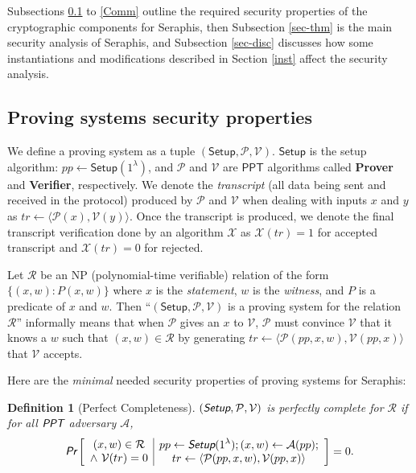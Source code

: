 \documentclass{article}
\newtheorem{definition}{Definition}[section]
\begin{document}
Subsections \ref{prov-prop} to \ref{Comm} outline the required security properties of the cryptographic components for Seraphis, then Subsection \ref{sec-thm} is the main security analysis of Seraphis, and Subsection \ref{sec-disc} discusses how some instantiations and modifications described in Section \ref{inst} affect the security analysis.

\subsection{Proving systems security properties}\label{prov-prop}
We define a proving system as a tuple $(\textsf{Setup}, \mathcal{P}, \mathcal{V})$. $\textsf{Setup}$ is the setup algorithm: $pp\leftarrow\textsf{Setup}(1^{\lambda})$, and $\mathcal{P}$ and $\mathcal{V}$ are $\textsf{PPT}$ algorithms called \textbf{Prover} and \textbf{Verifier}, respectively. We denote the \textit{transcript} (all data being sent and received in the protocol) produced by $\mathcal{P}$ and $\mathcal{V}$ when dealing with inputs $x$ and $y$ as $tr\leftarrow\langle\mathcal{P}(x), \mathcal{V}(y)\rangle$. Once the transcript is produced, we denote the final transcript verification done by an algorithm $\mathcal{X}$ as $\mathcal{X}(tr)=1$ for accepted transcript and $\mathcal{X}(tr)=0$ for rejected. 

Let $\mathcal{R}$ be an NP (polynomial-time verifiable) relation of the form $\{(x,w):P(x, w)\}$ where $x$ is the \textit{statement}, $w$ is the \textit{witness}, and $P$ is a predicate of $x$ and $w$. Then ``$(\textsf{Setup}, \mathcal{P}, \mathcal{V})$ is a proving system for the relation $\mathcal{R}$'' informally means that when $\mathcal{P}$ gives an $x$ to $\mathcal{V}$, $\mathcal{P}$ must convince $\mathcal{V}$ that it knows a $w$ such that $(x,w)\in\mathcal{R}$ by generating $tr\leftarrow\langle\mathcal{P}(pp, x, w), \mathcal{V}(pp, x)\rangle$ that $\mathcal{V}$ accepts.

Here are the \textit{minimal} needed security properties of proving systems for Seraphis:

\begin{definition}[Perfect Completeness]
$(\emph{\textsf{Setup}}, \mathcal{P}, \mathcal{V})$ is perfectly complete for $\mathcal{R}$ if for all $\emph{\textsf{PPT}}$ adversary $\mathcal{A}$,
\begin{align*}
\emph{\textsf{Pr}}\left[
\begin{array}{c|c}
    \begin{gathered}
        (x,w)\in\mathcal{R}\\
        \wedge\ \mathcal{V}(tr) = 0
    \end{gathered}
    &
    \begin{gathered}
        pp\leftarrow\emph{\textsf{Setup}}(1^{\lambda}); (x, w)\leftarrow\mathcal{A}(pp); \\
        tr\leftarrow\langle\mathcal{P}(pp,x,w), \mathcal{V}(pp,x)\rangle
    \end{gathered}
\end{array}
\right]
= 0.
\end{align*}
\end{definition}
\end{document}
